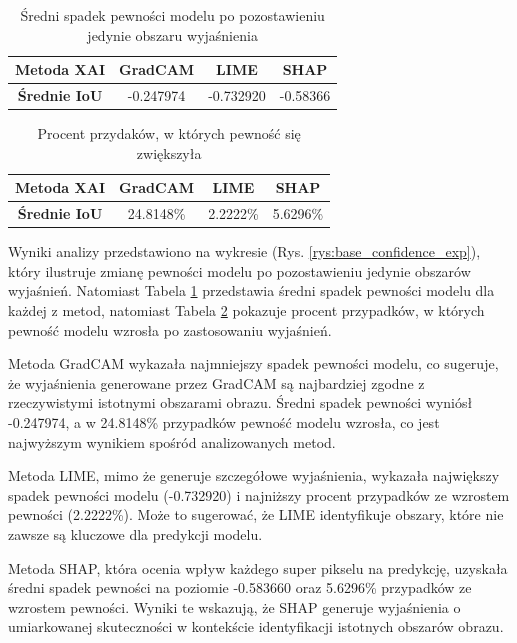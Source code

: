 \begin{table}[h]
	\centering
	\begin{tabular}{|c|c|c|c|}
		\hline
		\textbf{Metoda XAI}  & \textbf{GradCAM} & \textbf{LIME} & \textbf{SHAP} \\
		\hline
		\textbf{Średnie IoU} & -0.247974        & -0.732920     & -0.58366      \\
		\hline
	\end{tabular}
	\caption{Średni spadek pewności modelu po pozostawieniu jedynie obszaru wyjaśnienia}
	\label{tab:base_confidence_exp}
\end{table}

\begin{table}[h]
	\centering
	\begin{tabular}{|c|c|c|c|}
		\hline
		\textbf{Metoda XAI}  & \textbf{GradCAM} & \textbf{LIME} & \textbf{SHAP} \\
		\hline
		\textbf{Średnie IoU} & 24.8148\%        & 2.2222\%      & 5.6296\%      \\
		\hline
	\end{tabular}
	\caption{Procent przydaków, w których pewność się zwiększyła}
	\label{tab:base_confidence_exp_percent}
\end{table}

Wyniki analizy przedstawiono na wykresie (Rys. \ref{rys:base_confidence_exp}), który ilustruje zmianę pewności modelu po pozostawieniu jedynie obszarów wyjaśnień.
Natomiast Tabela \ref{tab:base_confidence_exp} przedstawia średni spadek pewności modelu dla każdej z metod, natomiast Tabela \ref{tab:base_confidence_exp_percent} pokazuje procent przypadków, w których pewność modelu wzrosła po zastosowaniu wyjaśnień.

Metoda GradCAM wykazała najmniejszy spadek pewności modelu, co sugeruje, że wyjaśnienia generowane przez GradCAM są najbardziej zgodne z rzeczywistymi istotnymi obszarami obrazu.
Średni spadek pewności wyniósł -0.247974, a w 24.8148\% przypadków pewność modelu wzrosła, co jest najwyższym wynikiem spośród analizowanych metod.

Metoda LIME, mimo że generuje szczegółowe wyjaśnienia, wykazała największy spadek pewności modelu (-0.732920) i najniższy procent przypadków ze wzrostem pewności (2.2222\%).
Może to sugerować, że LIME identyfikuje obszary, które nie zawsze są kluczowe dla predykcji modelu.

Metoda SHAP, która ocenia wpływ każdego super pikselu na predykcję, uzyskała średni spadek pewności na poziomie -0.583660 oraz 5.6296\% przypadków ze wzrostem pewności.
Wyniki te wskazują, że SHAP generuje wyjaśnienia o umiarkowanej skuteczności w kontekście identyfikacji istotnych obszarów obrazu.


